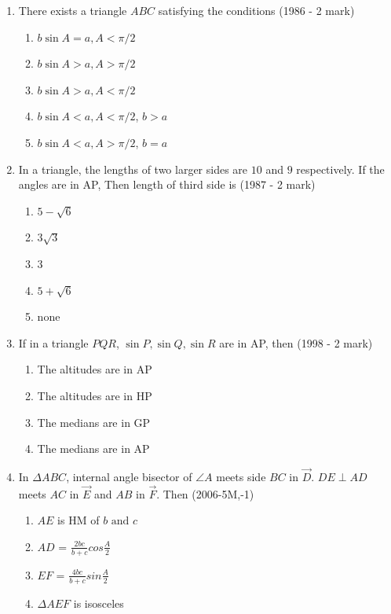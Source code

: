 \begin{enumerate}[label=\thesubsection.\arabic*,ref=\thesubsection.\theenumi]
    \item There exists a triangle $ABC$ satisfying the conditions
    \hfill{(1986 - 2 mark)}
    \begin{enumerate}
    	\item $b\sin{A} = a, A <\pi/2$
    	\item $b\sin{A} > a, A >\pi/2$
    	\item $b\sin{A} > a, A <\pi/2$
    	\item $b\sin{A} < a, A <\pi/2$, $b > a$
    	\item $b\sin{A} < a, A >\pi/2$, $b = a$
    \end{enumerate}
    \item In a triangle, the lengths of two larger sides are $10$ and $9$ respectively. If the angles are in AP, Then length of third side is
    \hfill{(1987 - 2 mark)}
    \begin{multicols}{2}
    	\begin{enumerate}
    		\item $5-\sqrt{6}$ 
    		\item $3\sqrt{3}$
    		\item $3$
    		\item $5+\sqrt{6}$ 
    		\item none
    	\end{enumerate}
    \end{multicols}
    \item If in a triangle $PQR$, $\sin{P}, \sin{Q}, \sin{R}$ are in AP, then
    \hfill{(1998 - 2 mark)}
    \begin{enumerate}
    	\item The altitudes are in AP
    	\item The altitudes are in HP
    	\item The medians are in GP
    	\item The medians are in AP
    \end{enumerate}
    \item In $\Delta ABC$, internal angle bisector of $\angle A$ meets side $BC$ in $\vec{D}$. $DE \perp AD$ meets $AC$ in $\vec{E}$ and $AB$ in $\vec{F}$. Then
    \hfill{(2006-5M,-1)}
    \begin{enumerate}
    	\item $AE$ is HM of $b \text{ and } c$
    	\item $AD$ = ${\frac{2bc}{b+c}}cos{\frac{A}{2}}$
    	\item $EF$ = ${\frac{4bc}{b+c}}sin{\frac{A}{2}}$
    	\item $\Delta AEF$ is isosceles

\end{enumerate}
\end{enumerate}

